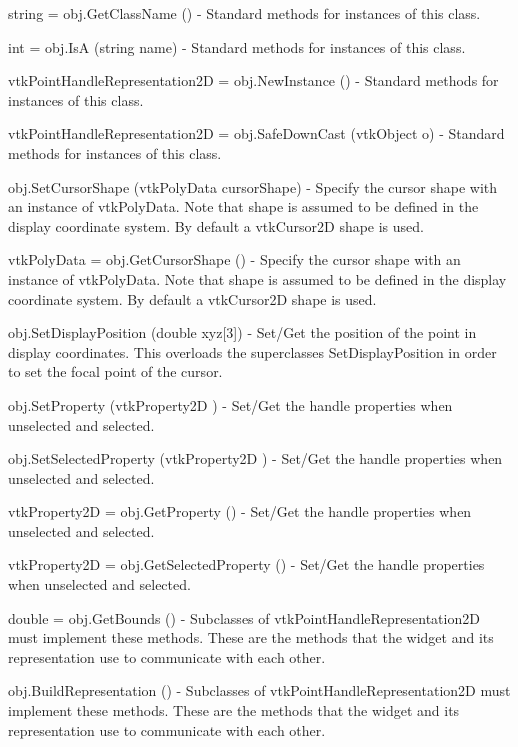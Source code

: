 \begin{DoxyItemize}
\item {\ttfamily string = obj.\-Get\-Class\-Name ()} -\/ Standard methods for instances of this class.  
\item {\ttfamily int = obj.\-Is\-A (string name)} -\/ Standard methods for instances of this class.  
\item {\ttfamily vtk\-Point\-Handle\-Representation2\-D = obj.\-New\-Instance ()} -\/ Standard methods for instances of this class.  
\item {\ttfamily vtk\-Point\-Handle\-Representation2\-D = obj.\-Safe\-Down\-Cast (vtk\-Object o)} -\/ Standard methods for instances of this class.  
\item {\ttfamily obj.\-Set\-Cursor\-Shape (vtk\-Poly\-Data cursor\-Shape)} -\/ Specify the cursor shape with an instance of vtk\-Poly\-Data. Note that shape is assumed to be defined in the display coordinate system. By default a vtk\-Cursor2\-D shape is used.  
\item {\ttfamily vtk\-Poly\-Data = obj.\-Get\-Cursor\-Shape ()} -\/ Specify the cursor shape with an instance of vtk\-Poly\-Data. Note that shape is assumed to be defined in the display coordinate system. By default a vtk\-Cursor2\-D shape is used.  
\item {\ttfamily obj.\-Set\-Display\-Position (double xyz\mbox{[}3\mbox{]})} -\/ Set/\-Get the position of the point in display coordinates. This overloads the superclasses Set\-Display\-Position in order to set the focal point of the cursor.  
\item {\ttfamily obj.\-Set\-Property (vtk\-Property2\-D )} -\/ Set/\-Get the handle properties when unselected and selected.  
\item {\ttfamily obj.\-Set\-Selected\-Property (vtk\-Property2\-D )} -\/ Set/\-Get the handle properties when unselected and selected.  
\item {\ttfamily vtk\-Property2\-D = obj.\-Get\-Property ()} -\/ Set/\-Get the handle properties when unselected and selected.  
\item {\ttfamily vtk\-Property2\-D = obj.\-Get\-Selected\-Property ()} -\/ Set/\-Get the handle properties when unselected and selected.  
\item {\ttfamily double = obj.\-Get\-Bounds ()} -\/ Subclasses of vtk\-Point\-Handle\-Representation2\-D must implement these methods. These are the methods that the widget and its representation use to communicate with each other.  
\item {\ttfamily obj.\-Build\-Representation ()} -\/ Subclasses of vtk\-Point\-Handle\-Representation2\-D must implement these methods. These are the methods that the widget and its representation use to communicate with each other.  

\end{DoxyItemize}
